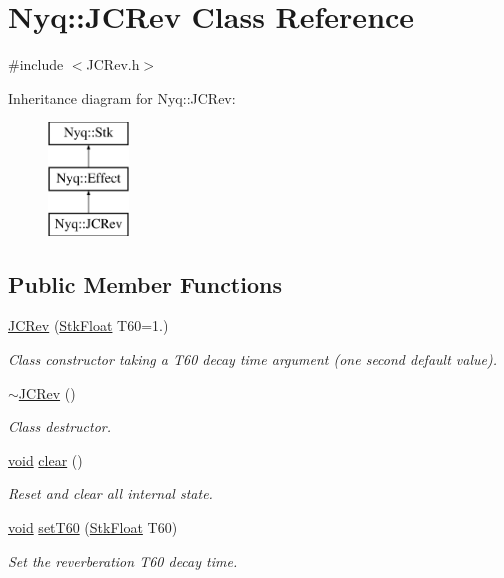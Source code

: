 \hypertarget{class_nyq_1_1_j_c_rev}{}\section{Nyq\+:\+:J\+C\+Rev Class Reference}
\label{class_nyq_1_1_j_c_rev}


{\ttfamily \#include $<$J\+C\+Rev.\+h$>$}

Inheritance diagram for Nyq\+:\+:J\+C\+Rev\+:\begin{figure}[H]
\begin{center}
\leavevmode
\includegraphics[height=3.000000cm]{class_nyq_1_1_j_c_rev}
\end{center}
\end{figure}
\subsection*{Public Member Functions}
\begin{DoxyCompactItemize}
\item 
\hyperlink{class_nyq_1_1_j_c_rev_aae9220e9ef24851d3828a164703e4413}{J\+C\+Rev} (\hyperlink{namespace_nyq_a044fa20a706520a617bbbf458a7db7e4}{Stk\+Float} T60=1.)
\begin{DoxyCompactList}\small\item\em Class constructor taking a T60 decay time argument (one second default value). \end{DoxyCompactList}\item 
\hyperlink{class_nyq_1_1_j_c_rev_ad7a645ec55f052ce2998633f712e72ae}{$\sim$\+J\+C\+Rev} ()
\begin{DoxyCompactList}\small\item\em Class destructor. \end{DoxyCompactList}\item 
\hyperlink{sound_8c_ae35f5844602719cf66324f4de2a658b3}{void} \hyperlink{class_nyq_1_1_j_c_rev_a87cd80fd021772d2e1be6bdc163b6071}{clear} ()
\begin{DoxyCompactList}\small\item\em Reset and clear all internal state. \end{DoxyCompactList}\item 
\hyperlink{sound_8c_ae35f5844602719cf66324f4de2a658b3}{void} \hyperlink{class_nyq_1_1_j_c_rev_af6c67cbae893d01e8e7d8d13431f3d85}{set\+T60} (\hyperlink{namespace_nyq_a044fa20a706520a617bbbf458a7db7e4}{Stk\+Float} T60)
\begin{DoxyCompactList}\small\item\em Set the reverberation T60 decay time. \end{DoxyCompactList}\end{DoxyCompactItemize}
